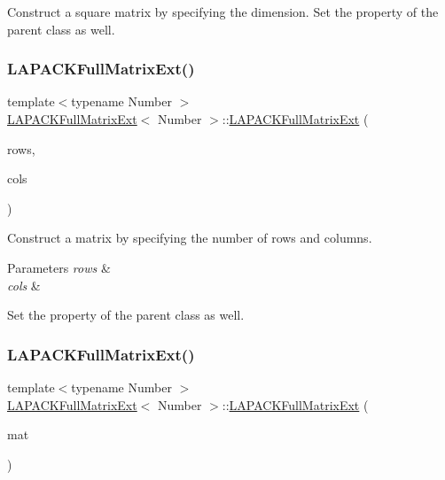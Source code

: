 Construct a square matrix by specifying the dimension. Set the property of the parent class as well.\mbox{\label{classLAPACKFullMatrixExt_a82986acedd4e702133151cb9a3ae2c97}} 
\subsubsection{\texorpdfstring{L\+A\+P\+A\+C\+K\+Full\+Matrix\+Ext()}{LAPACKFullMatrixExt()}\hspace{0.1cm}{\footnotesize\ttfamily [2/10]}}
{\footnotesize\ttfamily template$<$typename Number $>$ \\
\hyperlink{classLAPACKFullMatrixExt}{L\+A\+P\+A\+C\+K\+Full\+Matrix\+Ext}$<$ Number $>$\+::\hyperlink{classLAPACKFullMatrixExt}{L\+A\+P\+A\+C\+K\+Full\+Matrix\+Ext} (\begin{DoxyParamCaption}\item[{const \hyperlink{classLAPACKFullMatrixExt_a5cf5f4a6104dc17029210b5ca52bf574}{size\+\_\+type}}]{rows,  }\item[{const \hyperlink{classLAPACKFullMatrixExt_a5cf5f4a6104dc17029210b5ca52bf574}{size\+\_\+type}}]{cols }\end{DoxyParamCaption})}

Construct a matrix by specifying the number of rows and columns. 
\begin{DoxyParams}{Parameters}
{\em rows} & \\
\hline
{\em cols} & \\
\hline
\end{DoxyParams}
Set the property of the parent class as well.\mbox{\label{classLAPACKFullMatrixExt_a95c6843f5138c51aa42b554ec843b717}} 
\subsubsection{\texorpdfstring{L\+A\+P\+A\+C\+K\+Full\+Matrix\+Ext()}{LAPACKFullMatrixExt()}\hspace{0.1cm}{\footnotesize\ttfamily [3/10]}}
{\footnotesize\ttfamily template$<$typename Number $>$ \\
\hyperlink{classLAPACKFullMatrixExt}{L\+A\+P\+A\+C\+K\+Full\+Matrix\+Ext}$<$ Number $>$\+::\hyperlink{classLAPACKFullMatrixExt}{L\+A\+P\+A\+C\+K\+Full\+Matrix\+Ext} (\begin{DoxyParamCaption}\item[{const \hyperlink{classLAPACKFullMatrixExt}{L\+A\+P\+A\+C\+K\+Full\+Matrix\+Ext}$<$ Number $>$ \&}]{mat }\end{DoxyParamCaption})}

